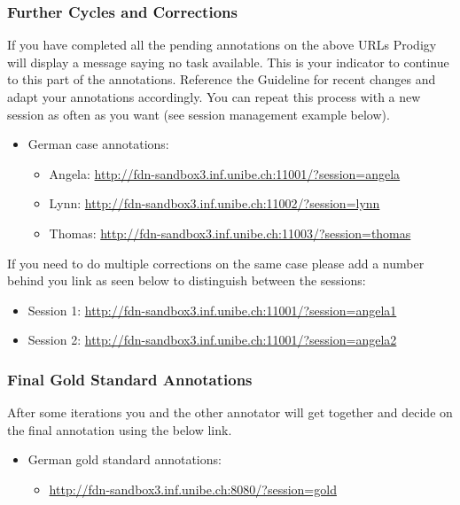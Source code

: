 \documentclass{article}
\begin{document}
\subsubsection{Further Cycles and Corrections}\label{2_cycle}
If you have completed all the pending annotations on the above URLs Prodigy will display a message saying no task available. This is your indicator to continue to this part of the annotations. Reference the Guideline for recent changes and adapt your annotations accordingly. You can repeat this process with a new session as often as you want (see session management example below).
\begin{itemize}
\item German case annotations:
\begin{itemize}
\item Angela: \href{http://fdn-sandbox3.inf.unibe.ch:11001/?session=angela}{http://fdn-sandbox3.inf.unibe.ch:11001/?session=angela}
    \item Lynn: \href{http://fdn-sandbox3.inf.unibe.ch:11002/?session=lynn}{http://fdn-sandbox3.inf.unibe.ch:11002/?session=lynn}
    \item Thomas: \href{http://fdn-sandbox3.inf.unibe.ch:11003/?session=thomas}{http://fdn-sandbox3.inf.unibe.ch:11003/?session=thomas}
\end{itemize}
\end{itemize}
If you need to do multiple corrections on the same case please add a number behind you link as seen below to distinguish between the sessions:

\begin{itemize}
\item Session 1: \href{http://fdn-sandbox3.inf.unibe.ch:11001/?session=angela1}{http://fdn-sandbox3.inf.unibe.ch:11001/?session=angela1}
\item Session 2: \href{http://fdn-sandbox3.inf.unibe.ch:11001/?session=angela2}{http://fdn-sandbox3.inf.unibe.ch:11001/?session=angela2}
\end{itemize}


\subsubsection{Final Gold Standard Annotations}\label{f_cycle}
After some iterations you and the other annotator will get together and decide on the final annotation using the below link.
\begin{itemize}
\item German gold standard annotations:
\begin{itemize}
\item \href{http://fdn-sandbox3.inf.unibe.ch:8080/?session=gold}{http://fdn-sandbox3.inf.unibe.ch:8080/?session=gold}
\end{itemize}
\end{itemize}
\end{document}
